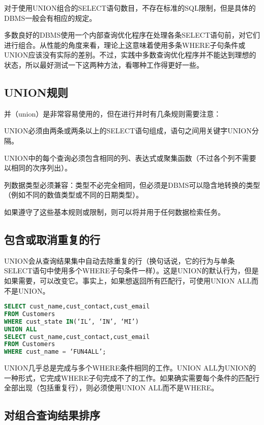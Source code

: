 对于使用UNION组合的SELECT语句数目，不存在标准的SQL限制，但是具体的DBMS一般会有相应的规定。

多数良好的DBMS使用一个内部查询优化程序在处理各条SELECT语句前，对它们进行组合。从性能的角度来看，理论上这意味着使用多条WHERE子句条件或UNION应该没有实际的差别。不过，实践中多数查询优化程序并不能达到理想的状态，所以最好测试一下这两种方法，看哪种工作得更好一些。


\subsection{UNION规则}

并（union）是非常容易使用的，但在进行并时有几条规则需要注意：

\begin{compactitem}
\item UNION必须由两条或两条以上的SELECT语句组成，语句之间用关键字UNION分隔。
\item UNION中的每个查询必须包含相同的列、表达式或聚集函数（不过各个列不需要以相同的次序列出）。
\item 列数据类型必须兼容：类型不必完全相同，但必须是DBMS可以隐含地转换的类型（例如不同的数值类型或不同的日期类型）。
\end{compactitem}

如果遵守了这些基本规则或限制，则可以将并用于任何数据检索任务。
\subsection{包含或取消重复的行}

UNION会从查询结果集中自动去除重复的行（换句话说，它的行为与单条SELECT语句中使用多个WHERE子句条件一样）。这是UNION的默认行为，但是如果需要，可以改变它。事实上，如果想返回所有匹配行，可使用UNION ALL而不是UNION。

\begin{lstlisting}[language=SQL]
SELECT cust_name,cust_contact,cust_email
FROM Customers
WHERE cust_state IN(‘IL’, ‘IN’, ‘MI’)
UNION ALL
SELECT cust_name,cust_contact,cust_email
FROM Customers
WHERE cust_name = ‘FUN4ALL’;
\end{lstlisting}

UNION几乎总是完成与多个WHERE条件相同的工作。UNION ALL为UNION的一种形式，它完成WHERE子句完成不了的工作。如果确实需要每个条件的匹配行全部出现（包括重复行），则必须使用UNION ALL而不是WHERE。



\subsection{对组合查询结果排序}

